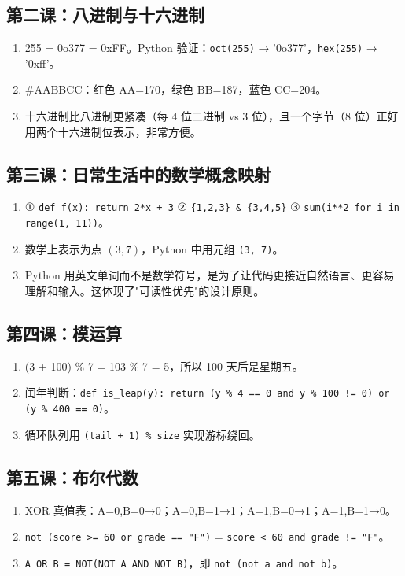 \documentclass[a4paper,12pt]{ctexart}
\begin{document}
\subsection*{第二课：八进制与十六进制}
\begin{enumerate}
  \item 255 = 0o377 = 0xFF。Python 验证：\texttt{oct(255)} → '0o377'，\texttt{hex(255)} → '0xff'。
  \item \#AABBCC：红色 AA=170，绿色 BB=187，蓝色 CC=204。
  \item 十六进制比八进制更紧凑（每 4 位二进制 vs 3 位），且一个字节（8 位）正好用两个十六进制位表示，非常方便。
\end{enumerate}

\subsection*{第三课：日常生活中的数学概念映射}
\begin{enumerate}
  \item ① \texttt{def f(x): return 2*x + 3} ② \texttt{\{1,2,3\} \& \{3,4,5\}} ③ \texttt{sum(i**2 for i in range(1, 11))}。
  \item 数学上表示为点 $(3, 7)$，Python 中用元组 \texttt{(3, 7)}。
  \item Python 用英文单词而不是数学符号，是为了让代码更接近自然语言、更容易理解和输入。这体现了"可读性优先"的设计原则。
\end{enumerate}

\subsection*{第四课：模运算}
\begin{enumerate}
  \item (3 + 100) \% 7 = 103 \% 7 = 5，所以 100 天后是星期五。
  \item 闰年判断：\texttt{def is\_leap(y): return (y \% 4 == 0 and y \% 100 != 0) or (y \% 400 == 0)}。
  \item 循环队列用 \texttt{(tail + 1) \% size} 实现游标绕回。
\end{enumerate}

\subsection*{第五课：布尔代数}
\begin{enumerate}
  \item XOR 真值表：A=0,B=0→0；A=0,B=1→1；A=1,B=0→1；A=1,B=1→0。
  \item \texttt{not (score >= 60 or grade == "F")} = \texttt{score < 60 and grade != "F"}。
  \item \texttt{A OR B = NOT(NOT A AND NOT B)}，即 \texttt{not (not a and not b)}。
\end{enumerate}
\end{document}
